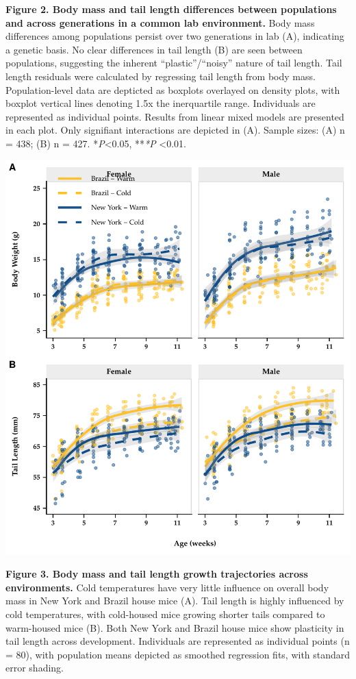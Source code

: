 \documentclass[]{article}
\begin{document}
\textbf{Figure 2. Body mass and tail length differences between
populations and across generations in a common lab environment.} Body
mass differences among populations persist over two generations in lab
(A), indicating a genetic basis. No clear differences in tail length (B)
are seen between populations, suggesting the inherent
``plastic''/``noisy'' nature of tail length. Tail length residuals were
calculated by regressing tail length from body mass. Population-level
data are depticted as boxplots overlayed on density plots, with boxplot
vertical lines denoting 1.5x the inerquartile range. Individuals are
represented as individual points. Results from linear mixed models are
presented in each plot. Only signifiant interactions are depicted in
(A). Sample sizes: (A) n = 438; (B) n = 427. *\emph{P}\textless{}0.05,
**\emph{*P} \textless{}0.01.

\newpage

\includegraphics{../figures/weekly_phenotypes.pdf}

\textbf{Figure 3. Body mass and tail length growth trajectories across
environments.} Cold temperatures have very little influence on overall
body mass in New York and Brazil house mice (A). Tail length is highly
influenced by cold temperatures, with cold-housed mice growing shorter
tails compared to warm-housed mice (B). Both New York and Brazil house
mice show plasticity in tail length across development. Individuals are
represented as individual points (n = 80), with population means
depicted as smoothed regression fits, with standard error shading.
\end{document}
